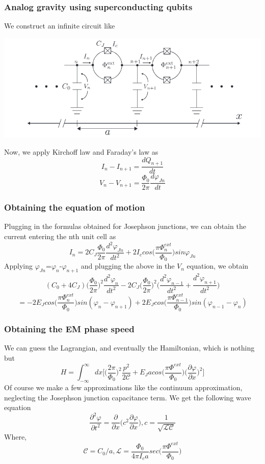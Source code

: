 \documentclass[11pt]{beamer}
\begin{document}
	\begin{frame}
		\frametitle{Analog gravity using superconducting qubits}
		We construct an infinite circuit like
		\begin{center}
			\includegraphics[width=8 cm]{sc9.png}
		\end{center}
		Now, we apply Kirchoff law and Faraday's law as
		\[I_n - I_{n+1}=\frac{dQ_{n+1}}{dt}\]
		\[V_n-V_{n+1}=\frac{\Phi_0}{2\pi}\frac{d\varphi_{Jn}}{dt}\]
	\end{frame}
	
		\begin{frame}
		\frametitle{Obtaining the equation of motion}
Plugging in the formulas obtained for Josephson junctions, we can obtain the current entering the nth unit cell as
\[I_n=2 C_J \frac{\Phi_0}{2\pi}\frac{d^2\varphi_{Jn}}{dt^2}+2I_ccos\bigg(\frac{\pi \Phi^{ext}_n}{\Phi_0}\bigg)sin\varphi_{Jn}\]
Applying $\varphi_{Jn}$=$\varphi_{n}$-$\varphi_{n+1}$ and plugging the above in the $V_n$ equation, we obtain
\[(C_0+4C_J)\bigg(\frac{\Phi_0}{2\pi}\bigg)^2\frac{d^2\varphi_{n}}{dt^2}-2C_J\bigg(\frac{\Phi_0}{2\pi}\bigg)^2\bigg( \frac{d^2\varphi_{n-1}}{dt^2}+\frac{d^2\varphi_{n+1}}{dt^2}  \bigg)\]
\[=-2E_Jcos\bigg(\frac{\pi \Phi^{ext}_n}{\Phi_0}\bigg)sin(\varphi_{n}-\varphi_{n+1})+2E_Jcos\bigg(\frac{\pi \Phi^{ext}_{n-1}}{\Phi_0}\bigg)sin(\varphi_{n-1}-\varphi_{n})\]
	\end{frame}
	
	\begin{frame}
		\frametitle{Obtaining the EM phase speed}
We can guess the Lagrangian, and eventually the Hamiltonian, which is nothing but
\[H=\int_{-\infty}^{\infty}dx\bigg[\bigg(\frac{2\pi}{\Phi_0}\bigg)^2\frac{p^2}{2\mathcal{C}}+E_Jacos\bigg(\frac{\pi \Phi^{ext}}{\Phi_0}\bigg)\bigg(\frac{\partial\varphi}{\partial x}\bigg)^2\bigg]\]
Of course we make a few approximations like the continuum approximation, neglecting the Josephson junction capacitance term. 
We get the following wave equation
\[\frac{\partial^2\varphi}{\partial t^2}=\frac{\partial}{\partial x}\bigg(c^2\frac{\partial \varphi}{\partial x}\bigg),c=\frac{1}{\sqrt{\mathcal{L}\mathcal{C}}}\]
Where,
\[\mathcal{C}=C_0/a,\mathcal{L}=\frac{\Phi_0}{4\pi I_ca}sec\bigg(\frac{\pi \Phi^{ext}}{\Phi_0}\bigg)\]
	\end{frame}
	
\end{document}
